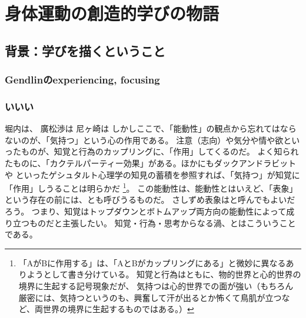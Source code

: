 \part{身体運動の創造的学びの物語}
\setcounter{chapter}{0} %
\chapter{背景：学びを描くということ}

\section{Gendlinのexperiencing, focusing}



\section{いいい}
堀内\cite{horiuchi_suwa:2020}は、
廣松渉\cite{hiromatsu:1989}は
尼ヶ崎\cite{amagasaki}は\cite{kimura}
しかしここで、「能動性」の観点から忘れてはならないのが、「気持つ」という心の作用である。
注意（志向）や気分や情や欲といったものが、知覚と行為のカップリングに、「作用」してくるのだ。
よく知られたものに、「カクテルパーティー効果」がある。ほかにもダックアンドラビットや
といったゲシュタルト心理学の知見の蓄積を参照すれば、「気持つ」が知覚に「作用」しうることは明らかだ
\footnote{
  「AがBに作用する」は、「AとBがカップリングにある」と微妙に異なるありようとして書き分けている。
  知覚と行為はともに、物的世界と心的世界の境界に生起する記号現象だが、
  気持つは心的世界での面が強い（もちろん厳密には、気持つというのも、興奮して汗が出るとか怖くて鳥肌が立つなど、両世界の境界に生起するものではある。）
}。
この能動性は、能動性とはいえど、「表象」という存在の前には、とも呼びうるものだ。
さしずめ表象はと呼んでもよいだろう。
つまり、知覚はトップダウンとボトムアップ両方向の能動性によって成り立つものだと主張したい。
知覚・行為・思考からなる渦、とはこういうことである。



